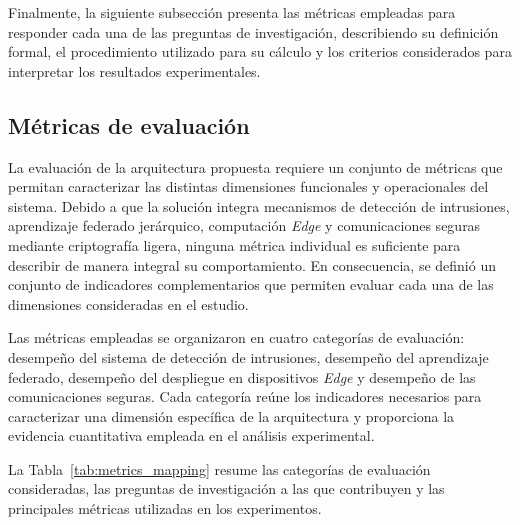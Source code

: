 \documentclass[journal,article,submit,moreauthors]{Definitions/mdpi}
\begin{document}
Finalmente, la siguiente subsección presenta las métricas empleadas para responder cada una de las preguntas de investigación, describiendo su definición formal, el procedimiento utilizado para su cálculo y los criterios considerados para interpretar los resultados experimentales.

\subsection{Métricas de evaluación}
\label{sec:evaluation_metrics}
La evaluación de la arquitectura propuesta requiere un conjunto de métricas que permitan caracterizar las distintas dimensiones funcionales y operacionales del sistema. Debido a que la solución integra mecanismos de detección de intrusiones, aprendizaje federado jerárquico, computación \textit{Edge} y comunicaciones seguras mediante criptografía ligera, ninguna métrica individual es suficiente para describir de manera integral su comportamiento. En consecuencia, se definió un conjunto de indicadores complementarios que permiten evaluar cada una de las dimensiones consideradas en el estudio.

Las métricas empleadas se organizaron en cuatro categorías de evaluación: desempeño del sistema de detección de intrusiones, desempeño del aprendizaje federado, desempeño del despliegue en dispositivos \textit{Edge} y desempeño de las comunicaciones seguras. Cada categoría reúne los indicadores necesarios para caracterizar una dimensión específica de la arquitectura y proporciona la evidencia cuantitativa empleada en el análisis experimental.

La Tabla~\ref{tab:metrics_mapping} resume las categorías de evaluación consideradas, las preguntas de investigación a las que contribuyen y las principales métricas utilizadas en los experimentos.
\end{document}
